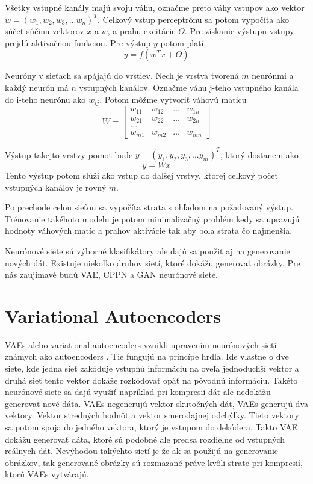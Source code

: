 Všetky vstupné kanály majú svoju váhu, označme preto váhy vstupov ako vektor \(w = (w_1, w_2, w_3, ... w_n)^T\).
Celkový vstup perceptrónu sa potom vypočíta ako súčet súčinu vektorov \(x\) a \(w\), a prahu excitácie \(\Theta\).
Pre získanie výstupu vstupy prejdú aktivačnou funkciou.
Pre výstup \(y\) potom platí \[y = f(w^Tx + \Theta)\]

Neuróny v sieťach sa spájajú do vrstiev. Nech je vrstva tvorená \(m\) neurónmi a každý neurón má \(n\) vstupných kanálov.
Označme váhu j-teho vstupného kanála do i-teho neurónu ako \(w_{ij}\).
Potom môžme vytvoriť váhovú maticu
\[
W = \begin{bmatrix}
		w_{11} & w_{12} & \dots & w_{1n} \\
		w_{21} & w_{22} & \dots & w_{2n} \\
		{...}							\\
		w_{m1} & w_{m2} & \dots & w_{mn}
     \end{bmatrix}
\]

Výstup takejto vrstvy pomot bude \(y = (y_1, y_2, y_3, ... y_m)^T\), ktorý dostanem ako \[y = Wx\]
Tento výstup potom slúži ako vstup do dalšej vrstvy, ktorej celkový počet vstupných kanálov je rovný \(m\).

Po prechode celou sieťou sa vypočíta strata s ohľadom na požadovaný výstup.
Trénovanie takéhoto modelu je potom minimalizačný problém kedy sa upravujú hodnoty váhových matíc a prahov aktivácie tak aby bola strata čo najmenšia.

Neurónové siete sú výborné klasifikátory ale dajú sa použiť aj na generovanie nových dát.
Existuje niekoľko druhov sietí, ktoré dokážu generovať obrázky.
Pre nás zaujímavé budú VAE, CPPN a GAN neurónové siete. 

\section{Variational Autoencoders}
VAEs alebo variational autoencoders vznikli upravením neurónových sietí známych ako autoencoders \cite{VAE}.
Tie fungujú na princípe hrdla. Ide vlastne o dve siete, kde jedna sieť zakóduje vstupnú informáciu na oveľa jednoduchší vektor a druhá sieť tento vektor dokáže rozkódovať opäť na pôvodnú informáciu.
Takéto neurónové siete sa dajú využiť napríklad pri kompresií dát ale nedokážu generovať nové dáta.
VAEs negenerujú vektor skutočných dát, VAEs generujú dva vektory.
Vektor stredných hodnôt a vektor smerodajnej odchýlky.
Tieto vektory sa potom spoja do jedného vektora, ktorý je vstupom do dekódera.
Takto VAE dokážu generovať dáta, ktoré sú podobné ale predsa rozdielne od vstupných reálnych dát.
Nevýhodou takýchto sietí je že ak sa použijú na generovanie obrázkov, tak generované obrázky sú rozmazané práve kvôli strate pri kompresií, ktorú VAEs vytvárajú.

